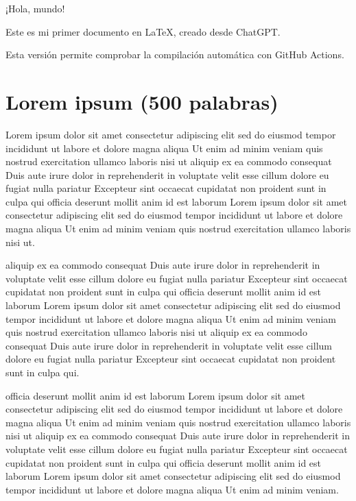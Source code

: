 \documentclass[12pt,a4paper]{article}
\begin{document}
\begin{center}
    \Huge ¡Hola, mundo!
\end{center}

Este es mi primer documento en \LaTeX, creado desde ChatGPT.

Esta versión permite comprobar la compilación automática con GitHub Actions.

\section*{Lorem ipsum (500 palabras)}

Lorem ipsum dolor sit amet consectetur adipiscing elit sed do eiusmod tempor incididunt ut labore et dolore magna aliqua Ut enim ad minim veniam quis nostrud exercitation ullamco laboris nisi ut aliquip ex ea commodo consequat Duis aute irure dolor in reprehenderit in voluptate velit esse cillum dolore eu fugiat nulla pariatur Excepteur sint occaecat cupidatat non proident sunt in culpa qui officia deserunt mollit anim id est laborum Lorem ipsum dolor sit amet consectetur adipiscing elit sed do eiusmod tempor incididunt ut labore et dolore magna aliqua Ut enim ad minim veniam quis nostrud exercitation ullamco laboris nisi ut.

aliquip ex ea commodo consequat Duis aute irure dolor in reprehenderit in voluptate velit esse cillum dolore eu fugiat nulla pariatur Excepteur sint occaecat cupidatat non proident sunt in culpa qui officia deserunt mollit anim id est laborum Lorem ipsum dolor sit amet consectetur adipiscing elit sed do eiusmod tempor incididunt ut labore et dolore magna aliqua Ut enim ad minim veniam quis nostrud exercitation ullamco laboris nisi ut aliquip ex ea commodo consequat Duis aute irure dolor in reprehenderit in voluptate velit esse cillum dolore eu fugiat nulla pariatur Excepteur sint occaecat cupidatat non proident sunt in culpa qui.

officia deserunt mollit anim id est laborum Lorem ipsum dolor sit amet consectetur adipiscing elit sed do eiusmod tempor incididunt ut labore et dolore magna aliqua Ut enim ad minim veniam quis nostrud exercitation ullamco laboris nisi ut aliquip ex ea commodo consequat Duis aute irure dolor in reprehenderit in voluptate velit esse cillum dolore eu fugiat nulla pariatur Excepteur sint occaecat cupidatat non proident sunt in culpa qui officia deserunt mollit anim id est laborum Lorem ipsum dolor sit amet consectetur adipiscing elit sed do eiusmod tempor incididunt ut labore et dolore magna aliqua Ut enim ad minim veniam.
\end{document}
